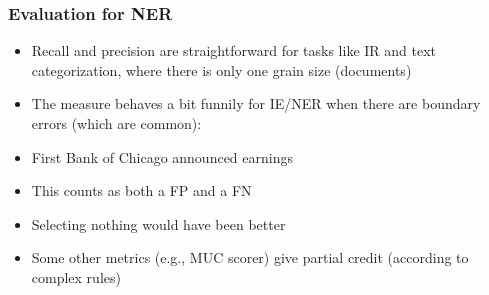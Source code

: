 \begin{frame}[fragile]\frametitle{Evaluation for NER }
  \begin{itemize}
  \item Recall and precision are straightforward for tasks like IR and text 
categorization, where there is only one grain size (documents)
  \item The measure behaves a bit funnily for IE/NER when there are 
boundary errors (which are common):
  \item First Bank of Chicago announced earnings
  \item This counts as both a FP and a FN
  \item Selecting nothing would have been better
  \item Some other metrics (e.g., MUC scorer) give partial credit (according to complex rules)
  \end{itemize}
\end{frame}
